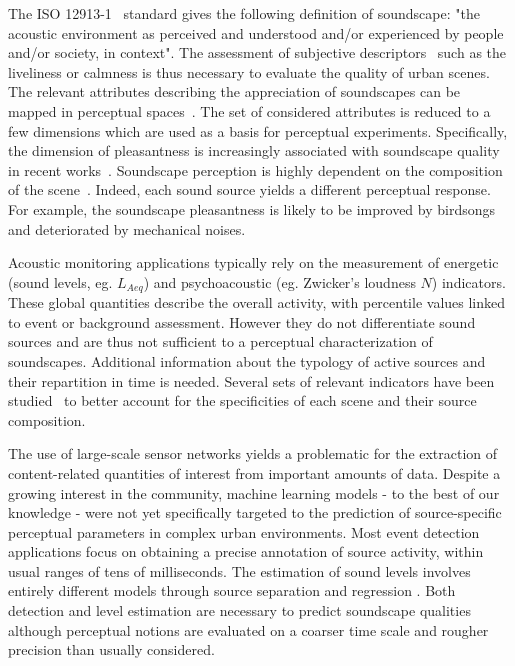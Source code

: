 \documentclass{article}
\begin{document}
\begin{sloppy}
The ISO 12913-1~\cite{iso2014} standard gives the following definition of soundscape: "the acoustic environment as perceived and understood and/or experienced by people and/or society, in context". The assessment of subjective descriptors~\cite{berglund2006, brown2011, aletta2016} such as the liveliness or calmness is thus necessary to evaluate the quality of urban scenes. The relevant attributes describing the appreciation of soundscapes can be mapped in perceptual spaces~\cite{axelsson2010, cain2013}. The set of considered attributes is reduced to a few dimensions which are used as a basis for perceptual experiments. Specifically, the dimension of pleasantness is increasingly associated with soundscape quality in recent works~\cite{decoensel2006, delaitre2014, ricciardi2014, aumond2017}. Soundscape perception is highly dependent on the composition of the scene~\cite{lavandier2006, nilsson2006}. Indeed, each sound source yields a different perceptual response. For example, the soundscape pleasantness is likely to be improved by birdsongs and deteriorated by mechanical noises.

Acoustic monitoring applications typically rely on the measurement of energetic (sound levels, eg. $L_{Aeq}$) and psychoacoustic (eg. Zwicker's loudness $N$) indicators. These global quantities describe the overall activity, with percentile values linked to event or background assessment. However they do not differentiate sound sources and are thus not sufficient to a perceptual characterization of soundscapes. Additional information about the typology of active sources and their repartition in time is needed. Several sets of relevant indicators have been studied~\cite{can2008, can2016, brocolini2013} to better account for the specificities of each scene and their source composition.

The use of large-scale sensor networks yields a problematic for the extraction of content-related quantities of interest from important amounts of data. Despite a growing interest in the community, machine learning models - to the best of our knowledge - were not yet specifically targeted to the prediction of source-specific perceptual parameters in complex urban environments. Most event detection applications focus on obtaining a precise annotation of source activity, within usual ranges of tens of milliseconds. The estimation of sound levels involves entirely different models through source separation and regression \cite{gloaguen2016}. Both detection and level estimation are necessary to predict soundscape qualities although perceptual notions are evaluated on a coarser time scale and rougher precision than usually considered.


\end{sloppy}
\end{document}
